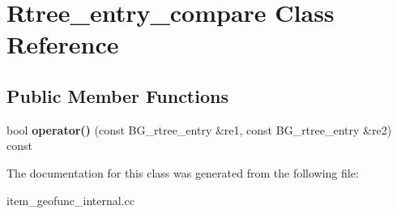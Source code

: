 \hypertarget{classRtree__entry__compare}{}\section{Rtree\+\_\+entry\+\_\+compare Class Reference}
\label{classRtree__entry__compare}
\subsection*{Public Member Functions}
\begin{DoxyCompactItemize}
\item 
\mbox{\label{classRtree__entry__compare_a492d6564ab2cc120bc0a0b51bff69a68}} 
bool {\bfseries operator()} (const B\+G\+\_\+rtree\+\_\+entry \&re1, const B\+G\+\_\+rtree\+\_\+entry \&re2) const
\end{DoxyCompactItemize}


The documentation for this class was generated from the following file\+:\begin{DoxyCompactItemize}
\item 
item\+\_\+geofunc\+\_\+internal.\+cc\end{DoxyCompactItemize}
